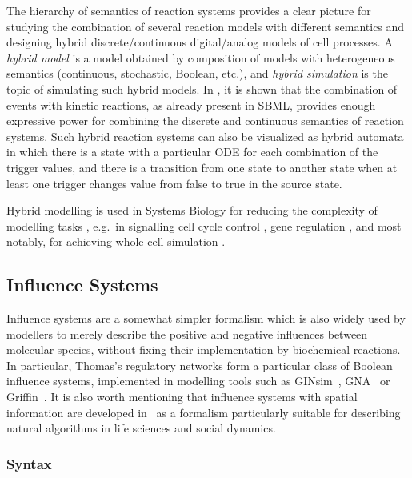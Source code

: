 \documentclass[graybox]{svmult}
\begin{document}
The hierarchy of semantics of reaction systems provides a clear picture for studying the combination of several reaction models with different semantics
and designing hybrid discrete/continuous digital/analog models of cell processes.
A \emph{hybrid model}
is a model obtained by composition of models with heterogeneous semantics
(continuous, stochastic, Boolean, etc.),
and \emph{hybrid simulation} is the topic of simulating such hybrid models.
In \cite{CFJS15tomacs}, it is shown that the combination of events with kinetic reactions,
as already present in SBML, provides  enough expressive power for
combining the discrete and continuous semantics of reaction systems.
Such hybrid reaction systems can also be visualized
as hybrid automata~\cite{Henzinger96lics} in which there is a
state with a particular ODE for each combination of the trigger
values, and there is a transition from one state to another state
when at least one trigger changes value from false to true in the
source state.

Hybrid modelling is used in Systems Biology for reducing the
complexity of modelling tasks \cite{ABIKMPRS01hscc,BZNN13pcb},
e.g.~in signalling 
\cite{GT01hscc}
cell cycle control \cite{SSJT11plos},
gene regulation \cite{MDNM00psb,ABCLR06complexus},
and most notably, for achieving whole cell simulation \cite{Karr12cell}.


\subsection{Influence Systems}

Influence systems are a somewhat simpler formalism which is also widely used by modellers
to merely describe the positive and negative influences between molecular species,
without fixing their implementation by biochemical reactions.
In particular, Thomas's regulatory networks form a particular class of Boolean influence systems,
implemented in modelling tools such as GINsim~\cite{NBFLTC09bs}, GNA~\cite{BBCdJDGMMPRR12} or Griffin~\cite{RMCA14alcob}.
It is also worth mentioning that influence systems with spatial information are developed in~\cite{Chazelle12cacm}
as a formalism particularly suitable for describing natural algorithms
in life sciences and social dynamics.


\subsubsection{Syntax}
\end{document}
